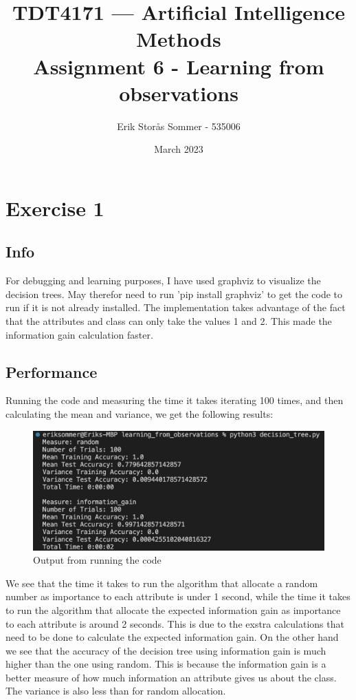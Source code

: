 \documentclass{article}
\title{TDT4171 — Artificial Intelligence Methods \\ Assignment 6 - Learning from observations}
\author{Erik Storås Sommer - 535006}
\date{March 2023}
\begin{document}
\maketitle
\setlength{\parindent}{0pt}

\section*{Exercise 1}

\subsection*{Info}

For debugging and learning purposes, I have used graphviz to visualize the decision trees.
May therefor need to run 'pip install graphviz' to get the code to run if it is not already installed.
The implementation takes advantage of the fact that the attributes and class can only take the values 1 and 2.
This made the information gain calculation faster.

\subsection*{Performance}

Running the code and measuring the time it takes iterating 100 times, and then calculating the mean and variance, we get the following results:

\begin{figure}[h]
    \includegraphics[width=\linewidth]{images/output.png}
    \caption{Output from running the code}
    \label{fig:image1}
\end{figure}

We see that the time it takes to run the algorithm that allocate a random number as importance to each attribute is under 1 second, while the time it takes to run the algorithm that allocate the expected information gain as importance to each attribute is around 2 seconds.
This is due to the exstra calculations that need to be done to calculate the expected information gain.
On the other hand we see that the accuracy of the decision tree using information gain is much higher than the one using random.
This is because the information gain is a better measure of how much information an attribute gives us about the class.
The variance is also less than for random allocation.
\end{document}
